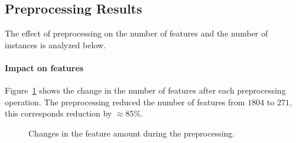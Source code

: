 \subsection{Preprocessing Results}
The effect of preprocessing on the number of features and the number of instances is analyzed below.

\paragraph*{Impact on features} \hfill \break
Figure~\ref{fig:features-preprocessing} shows the change in the number of features after each preprocessing operation. The preprocessing reduced the number of features from \(1804\) to \(271\), this corresponds reduction by \(\approx85\%\). 

\begin{figure}[h!]
    \centering
    \caption{Changes in the feature amount during the preprocessing.}
    \label{fig:features-preprocessing}
\end{figure}

